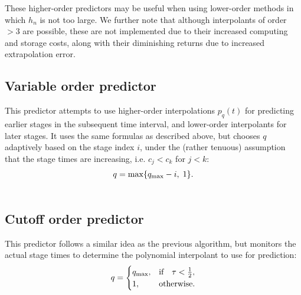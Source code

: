 \documentclass[letterpaper,10pt,english]{sphinxmanual}
\begin{document}
These higher-order predictors may be useful when using lower-order
methods in which $h_n$ is not too large.  We further note that
although interpolants of order $> 3$ are possible, these are not
implemented due to their increased computing and storage costs, along
with their diminishing returns due to increased extrapolation error.


\subsection{Variable order predictor}
\label{Mathematics:variable-order-predictor}\label{Mathematics:mathematics-predictors-decreasing}
This predictor attempts to use higher-order interpolations
$p_q(t)$ for predicting earlier stages in the subsequent time
interval, and lower-order interpolants for later stages.  It uses the
same formulas as described above, but chooses $q$ adaptively
based on the stage index $i$, under the (rather tenuous)
assumption that the stage times are increasing, i.e. $c_j < c_k$
for $j<k$:
\begin{gather}
\begin{split}q = \max\{ q_\text{max} - i,\; 1 \}.\end{split}\notag\\\begin{split}\end{split}\notag
\end{gather}

\subsection{Cutoff order predictor}
\label{Mathematics:cutoff-order-predictor}\label{Mathematics:mathematics-predictors-cutoff}
This predictor follows a similar idea as the previous algorithm, but
monitors the actual stage times to determine the polynomial
interpolant to use for prediction:
\begin{gather}
\begin{split}q = \begin{cases}
   q_\text{max}, & \text{if}\quad \tau < \tfrac12,\\
   1, & \text{otherwise}.
\end{cases}\end{split}\notag\\\begin{split}\end{split}\notag
\end{gather}
\end{document}
